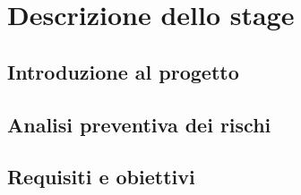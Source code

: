 \chapter{Descrizione dello stage}
\label{chap:descrizione-stage}

\section{Introduzione al progetto}

\section{Analisi preventiva dei rischi}


\section{Requisiti e obiettivi}



